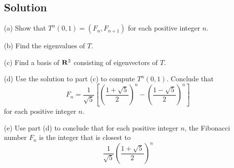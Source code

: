 \documentclass{article}
\begin{document}
\subsection*{Solution}

(a) Show that $T^n(0,1)=(F_n,F_{n+1})$ for each positive integer $n$.

(b) Find the eigenvalues of $T$.

(c) Find a basis of $\mathbf{R}^2$ consisting of eigenvectors of $T$.

(d) Use the solution to part (c) to compute $T^n(0,1)$. Conclude that
\[F_n = \frac{1}{\sqrt{5}} \left[ \left( \frac{1 + \sqrt{5}}{2} \right)^n - \left( \frac{1 - \sqrt{5}}{2} \right)^n \right]
\]
for each positive integer $n$.

(e) Use part (d) to conclude that for each positive integer $n$, the Fibonacci number $F_n$ is the integer that is closest to
\[\frac{1}{\sqrt{5}} \left( \frac{1 + \sqrt{5}}{2} \right)^n
\]
\end{document}
